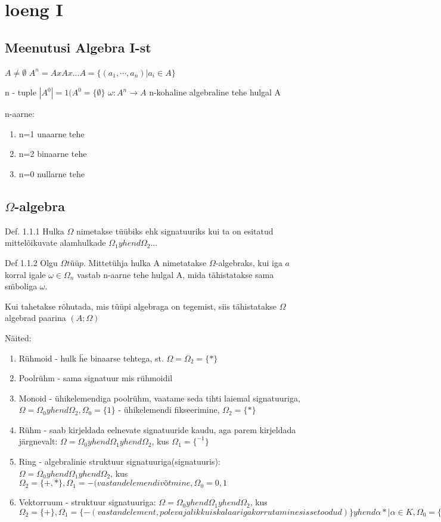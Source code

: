 \documentclass[12pt]{article}
\begin{document}
\section{loeng I}

\subsection{Meenutusi Algebra I-st}

$A \neq \emptyset$
$A^n = A x A x ... A = \{(a_1,\cdots,a_n)| a_i \in A \}$

n - tuple
$|A^0| = 1 (A^0 = \{ \emptyset \}$
$\omega: A^n \rightarrow A$ 
n-kohaline algebraline tehe hulgal A

n-aarne:
\begin{enumerate}
\item n=1 unaarne tehe
\item n=2 binaarne tehe
\item n=0 nullarne tehe
\end{enumerate}


\subsection{$\Omega$-algebra}

Def. 1.1.1 Hulka $\Omega$ nimetakse t\"u\"ubiks ehk signatuuriks kui ta on esitatud mittelõikuvate alamhulkade $\Omega_1 yhend \Omega_2...$

Def 1.1.2 Olgu $\Omega tüüp$. Mittet\"uhja hulka A nimetatakse $\Omega$-algebraks, kui iga $a$ korral igale $\omega \in \Omega_n$ vastab n-aarne tehe hulgal A, mida tähistatakse sama s\"mboliga $\omega$. 

Kui tahetakse rõhutada, mis t\"u\"upi algebraga on tegemist, siis tähistatakse $\Omega$ algebrad paarina $(A;\Omega)$

Näited:

\begin{enumerate}
\item R\"uhmoid - hulk \"he binaarse tehtega, st. $\Omega= \Omega_2 = \{*\}$
\item Poolr\"uhm - sama signatuur mis r\"uhmoidil
\item Monoid - \"uhikelemendiga poolr\"uhm, vaatame seda tihti laiemal signatuuriga, $\Omega = \Omega_0 yhend \Omega_2, \Omega_0 = \{1\}$ - \"uhikelemendi fikseerimine, $\Omega_2 = \{*\}$
\item R\"uhm - saab kirjeldada eelnevate signatuuride kaudu, aga parem kirjeldada järgnevalt: $\Omega = \Omega_0 yhend \Omega_1 yhend \Omega_2$, kus $\Omega_1 = \{ ^{-1}\}$
\item Ring - algebralinie struktuur signatuuriga(signatuuris): $\Omega = \Omega_0 yhend \Omega_1 yhend \Omega_2$, kus $\Omega_2 = \{+,*\}, \Omega_1 = {-(vastandelemendi võtmine}, \Omega_0 = {0,1}$
\item Vektorruum - struktuur signatuuriga:
$\Omega = \Omega_0 yhend \Omega_1 yhend \Omega_2$, kus
$\Omega_2 = \{+\}, \Omega_1 = \{-(vastandelement, pole vajalik kui skalaariga korrutamine sissetoodud)\} yhend {\alpha * | \alpha \in K}, \Omega_0 = \{0\} - samuti avaldatav skalaariga korrutimase kaudu$ 
\end{enumerate}
\end{document}
